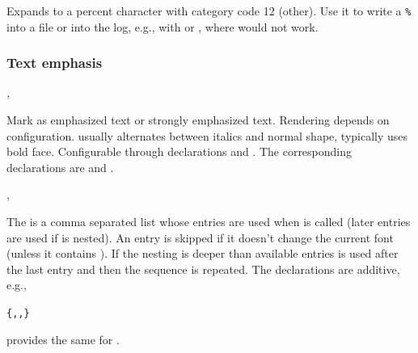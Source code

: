 \documentclass{l3in2edoc}
\begin{document}
%



\begin{function}[EXP]
  {
    \@percentchar
  }
  Expands to a percent character with category code 12 (other). Use it
  to write a \texttt{\%} into a file or into the log, e.g., with
   or , where \cs{\%} would not
  work.
\end{function}






\subsubsection{Text emphasis}


\begin{function}[user]
  {
    \emph,
    \strongemph
  }
  \begin{syntax}
      
      
  \end{syntax}
  Mark  as emphasized text or strongly emphasized
  text. Rendering depends on configuration.  usually
  alternates between italics and normal shape, 
  typically uses bold face. Configurable through declarations
   and .
  The corresponding declarations are  and .
\end{function}


\begin{function}[]
  {
    \DeclareEmphSequence,
    \DeclareStrongEmphSequence
  }
  \begin{syntax}
     
  \end{syntax}
  The  is a comma separated list whose
  entries are used when  is called (later entries are used if
   is nested). An entry is skipped if it doesn't change the
  current font (unless it contains ). If the nesting is
  deeper than available entries  is used after the last
  entry and then the sequence is repeated. The declarations are
  additive, e.g.,
  \begin{alltt}
    \{,,\}
  \end{alltt}

   provides the same for .

\end{function}
\end{document}
